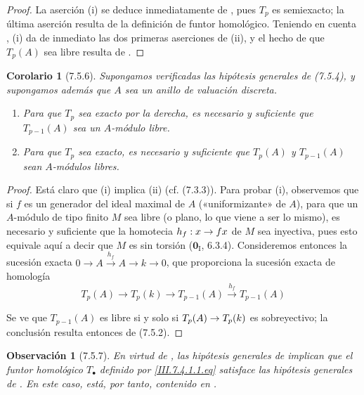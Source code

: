 \documentclass[10pt,oneside,openany]{book}
\theoremstyle{egaenv}\newtheorem*{env}{---}
\theoremstyle{egastatement}
\newtheorem*{corollary}{Corolario}
\theoremstyle{egadescription}
\newtheorem*{remark}{Observación}
\newcommand{\oldpage}[2][]{\marginnote{\normalfont\scriptsize\textbf{#1}\,|\,#2}\ignorespaces}
\renewcommand{\to}{\mathchoice{\longrightarrow}{\rightarrow}{\rightarrow}{\rightarrow}}
\begin{document}
\begin{proof}
La aserción (i) se deduce inmediatamente de , pues
$T_p$ es semiexacto; la última aserción resulta de la definición de
funtor homológico. Teniendo en cuenta , (i) da de
inmediato las dos primeras aserciones de (ii), y el hecho de que
$T_p(A)$ sea libre resulta de .
\end{proof}

\begin{corollary}[7.5.6]
Supongamos verificadas las hipótesis generales de \textup{(7.5.4)}, y supongamos además
que $A$ sea un anillo de valuación discreta.
\begin{enumerate}
  \item[\textup{(i)}] Para que $T_p$ sea exacto por la derecha, es necesario y suficiente que
    $T_{p-1}(A)$ sea un $A$-módulo libre.
  \item[\textup{(ii)}] Para que $T_p$ sea exacto, es necesario y suficiente que $T_p(A)$ y
    $T_{p-1}(A)$ sean $A$-módulos libres.
\end{enumerate}
\end{corollary}

\begin{proof}
\oldpage[III]{192}
Está claro que (i) implica (ii) (cf. (7.3.3)). Para probar (i), observemos
que si $f$ es un generador del ideal maximal de $A$ («uniformizante» de
$A$), para que un $A$-módulo de tipo finito $M$ sea libre (o plano, lo que viene
a ser lo mismo), es necesario y suficiente que la homotecia $h_f:x\to fx$ de $M$ sea
inyectiva, pues esto equivale aquí a decir que $M$ es sin torsión
($\mathbf{0}_{\mathrm I}$, 6.3.4). Consideremos entonces la sucesión exacta
$0\longrightarrow A\xrightarrow{h_f}A\longrightarrow k\longrightarrow0$,
que proporciona la sucesión exacta de homología
\[
  T_p(A)
  \longrightarrow T_p(k)
  \longrightarrow T_{p-1}(A)
  \xrightarrow{h_f}T_{p-1}(A)
\]

Se ve que $T_{p-1}(A)$ es libre si y solo si
$T_p(A)\to T_p(k)$ es sobreyectivo; la conclusión resulta entonces de (7.5.2).
\end{proof}

\begin{remark}[7.5.7]
\label{III.7.5.7}
En virtud de , las hipótesis generales de
 implican que el funtor homológico $T_\bullet$
definido por \eqref{III.7.4.1.1.eq} satisface las hipótesis generales
de . En este caso,  está, por tanto,
contenido en .
\end{remark}
\end{document}
